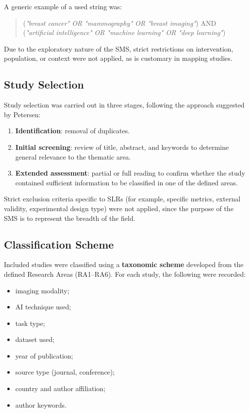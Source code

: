 A generic example of a used string was:

\begin{quote}
(\textit{"breast cancer" OR "mammography" OR "breast imaging"}) AND  
(\textit{"artificial intelligence" OR "machine learning" OR "deep learning"})  
\end{quote}

Due to the exploratory nature of the SMS, strict restrictions on intervention, population, or context were not applied, as is customary in mapping studies.

\subsection{Study Selection}
Study selection was carried out in three stages, following the approach suggested by Petersen:

\begin{enumerate}
    \item \textbf{Identification}: removal of duplicates.
    \item \textbf{Initial screening}: review of title, abstract, and keywords to determine general relevance to the thematic area.
    \item \textbf{Extended assessment}: partial or full reading to confirm whether the study contained sufficient information to be classified in one of the defined areas.
\end{enumerate}

Strict exclusion criteria specific to SLRs (for example, specific metrics, external validity, experimental design type) were not applied, since the purpose of the SMS is to represent the breadth of the field.

\subsection{Classification Scheme}
Included studies were classified using a \textbf{taxonomic scheme} developed from the defined Research Areas (RA1--RA6). For each study, the following were recorded:

\begin{itemize}
    \item imaging modality;
    \item AI technique used;
    \item task type;
    \item dataset used;
    \item year of publication;
    \item source type (journal, conference);
    \item country and author affiliation;
    \item author keywords.
\end{itemize}

